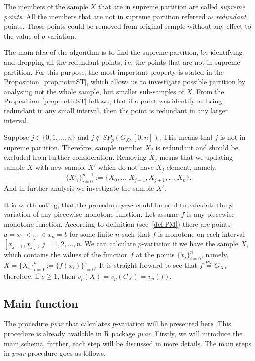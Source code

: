 \documentclass[12pt, a4paper]{article}
\numberwithin{equation}{section}
\begin{document}
The members of the sample $X$ that are in supreme partition are
called \emph{supreme points}. All the members
that are not in supreme partition refereed as
\emph{redundant} points. 
Those points could be removed from original sample without any effect to 
the value of $p$-variation.

The main idea of the algorithm is to find the supreme
partition, by identifying and dropping all the redundant
points, i.e. the points that are not in supreme partition.
For this purpose, the most important property is
stated in the Proposition~\ref{prop:notinST},
which allows us to investigate possible 
partition by analysing not the whole sample, but
smaller sub-samples of $X$. From the
Proposition~\ref{prop:notinST} follows, that 
if a point was identify as being redundant in any
small interval, then the point is redundant in
any larger interval. 

Suppose $j \in \{0, 1, \dots, n\}$ and
$j \notin SP_p(G_X, [0, n])$. This means that
$j$ is not in supreme partition. Therefore, 
sample member $X_j$ is redundant and should be excluded from further consideration.
Removing $X_j$ means that we 
updating sample $X$ with new sample $X'$ which do not have
$X_j$ element, namely,  
$$
\{X'_{i}\}_{i=0}^{n-1}:=\{X_0,\dots,X_{j-1},X_{j+1},\dots,X_n\}.
$$
And in further analysis we investigate the sample $X'$. 

It is worth noting, 
that the procedure \emph{pvar} could be used to calculate
the $p$-variation of any piecewise monotone function.
Let assume $f$ is any piecewise monotone function.  
According to definition (see~\ref{def:PM}) 
there are points $a=x_1<\dots<x_n=b$ for some finite $n$ such 
that $f$ is monotone on each interval 
$[x_{j-1},x_j],\;j=1,2,\dots,n$.
We can calculate $p$-variation if we have the sample $X$, 
which contains the values of the function $f$ 
at the points $\{x_{i}\}_{i=0}^{n}$, namely,
$X=\{X_{i}\}_{i=0}^{n}:=\{f(x_{i})\}_{i=0}^{n}$.
It is straight forward to see that 
$f \stackrel{PM}{=} G_X$, 
therefore, if $p \geq 1$, then $v_p(X)=v_p(G_X)=v_p(f)$.


\subsection{Main function}
\label{sub:MainFunction}

The procedure \emph{pvar} that calculates
$p$-variation will be presented here. This procedure
is already available in R package \emph{pvar}. Firstly,
we will introduce the main schema, further, each step will
be discussed in more details. 
The main steps in \emph{pvar} procedure
goes as follows.
\end{document}
